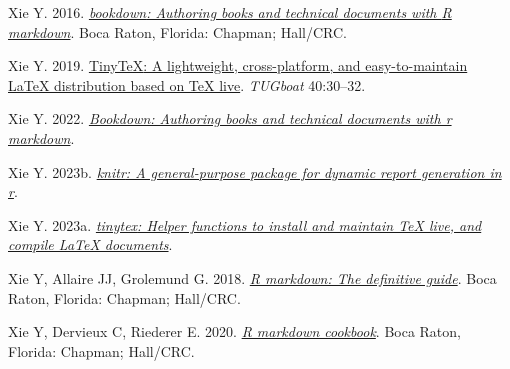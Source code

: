\documentclass[10pt,a4paper]{article}
\newlength{\cslhangindent}
\newlength{\cslentryspacingunit} %
\newenvironment{CSLReferences}[2] %
 {%
  \setlength{\parindent}{0pt}
  \ifodd #1
  \let\oldpar\par
  \def\par{\hangindent=\cslhangindent\oldpar}
  \fi
  \setlength{\parskip}{#2\cslentryspacingunit}
 }%
 {}
\begin{document}
\begin{CSLReferences}{1}{0}
\leavevmode{}%
Xie Y. 2016. \emph{\href{https://bookdown.org/yihui/bookdown}{{bookdown}: Authoring books and technical documents with {R} markdown}}. Boca Raton, Florida: Chapman; Hall/CRC.

\leavevmode{}%
Xie Y. 2019. \href{https://tug.org/TUGboat/Contents/contents40-1.html}{{TinyTeX}: A lightweight, cross-platform, and easy-to-maintain LaTeX distribution based on TeX live}. \emph{TUGboat} 40:30--32.

\leavevmode{}%
Xie Y. 2022. \emph{\href{https://CRAN.R-project.org/package=bookdown}{Bookdown: Authoring books and technical documents with r markdown}}.

\leavevmode{}%
Xie Y. 2023b. \emph{\href{https://yihui.org/knitr/}{{knitr}: A general-purpose package for dynamic report generation in r}}.

\leavevmode{}%
Xie Y. 2023a. \emph{\href{https://github.com/rstudio/tinytex}{{tinytex}: Helper functions to install and maintain TeX live, and compile LaTeX documents}}.

\leavevmode{}%
Xie Y, Allaire JJ, Grolemund G. 2018. \emph{\href{https://bookdown.org/yihui/rmarkdown}{R markdown: The definitive guide}}. Boca Raton, Florida: Chapman; Hall/CRC.

\leavevmode{}%
Xie Y, Dervieux C, Riederer E. 2020. \emph{\href{https://bookdown.org/yihui/rmarkdown-cookbook}{R markdown cookbook}}. Boca Raton, Florida: Chapman; Hall/CRC.

\end{CSLReferences}
\end{document}
